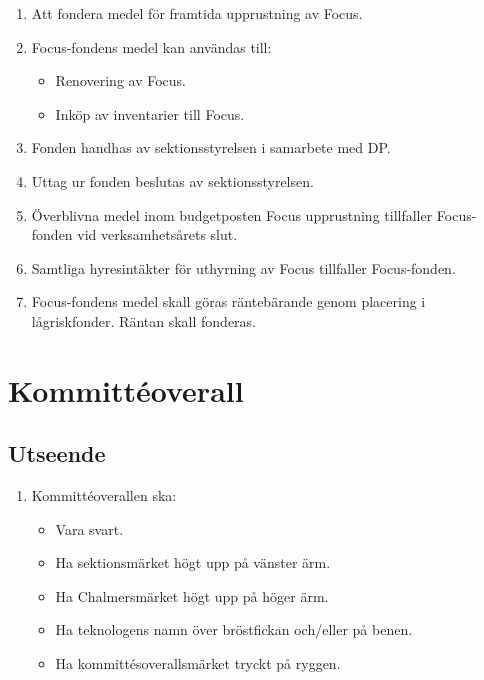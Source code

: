 \documentclass[11pt,a4paper]{article}
\begin{document}
\begin{enumerate}[\thesubsection .1]

  \item Att fondera medel för framtida upprustning av Focus.

  \item Focus-fondens medel kan användas till:
    \begin{itemize}
      \item Renovering av Focus.
      \item Inköp av inventarier till Focus.
    \end{itemize}

  \item Fonden handhas av sektionsstyrelsen i samarbete med DP.

  \item Uttag ur fonden beslutas av sektionsstyrelsen.

  \item Överblivna medel inom budgetposten Focus upprustning tillfaller Focus-fonden vid verksamhetsårets slut.
  
  \item Samtliga hyresintäkter för uthyrning av Focus tillfaller Focus-fonden.

  \item Focus-fondens medel skall göras räntebärande genom placering i
  låg\-risk\-fond\-er. Räntan skall fonderas.

\end{enumerate}

\section{Kommittéoverall}

\subsection{Utseende}

\begin{enumerate}[\thesubsection .1]
  \item Kommittéoverallen ska:
    \begin{itemize}
      \item Vara svart.
      \item Ha sektionsmärket högt upp på vänster ärm.
      \item Ha Chalmersmärket högt upp på höger ärm.
      \item Ha teknologens namn över bröstfickan och/eller på benen.
      \item Ha kommittésoverallsmärket tryckt på ryggen.
    \end{itemize}
\end{enumerate}
\end{document}
